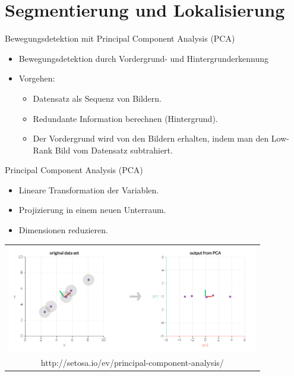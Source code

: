\section{Segmentierung und Lokalisierung}
\begin{frame}[t,fragile]{Bewegungsdetektion mit Principal Component Analysis (PCA) }
	\begin{itemize}
  \item Bewegungsdetektion durch Vordergrund- und Hintergrunderkennung

  \item{Vorgehen:}
      \begin{itemize}
        \item{Datensatz als Sequenz von Bildern.}
        \item{Redundante Information berechnen (Hintergrund).}
        \item{Der Vordergrund wird von den Bildern erhalten, indem man den 	Low-Rank Bild vom Datensatz  subtrahiert.}
      \end{itemize}

  \end{itemize}
\end{frame}

\begin{frame}[t,fragile]{Principal Component Analysis (PCA) }
      \begin{itemize}
        \item{Lineare Transformation der Variablen.}
        \item{Projizierung in einem neuen Unterraum.}
        \item{Dimensionen reduzieren.}
  
    
      \end{itemize}
       
  \vspace{0.01em}
  {
\begin{table}
\centering
        \begin{tabular}{c}
        \includegraphics[width=11cm]{images/Segmentierung/PCA}\\
      \tiny{http://setosa.io/ev/principal-component-analysis/}
         \end{tabular}
        
\end{table}
 }
\end{frame}


